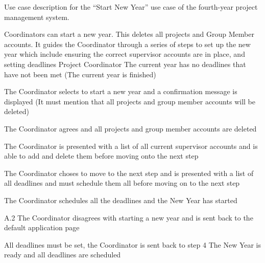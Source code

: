\documentclass[document.tex]{subfiles}
\begin{document}
\begin{table}
  \centering
  \caption{Use case description for the ``Start New Year'' use case of the fourth-year project management system.}
  \label{tbl:use-case-start-new-year}

  \begin{usecase}
    Coordinators can start a new year. This deletes all projects and Group Member accounts. It guides the Coordinator through a series of steps to set up the new year which include ensuring the correct supervisor accounts are in place, and setting deadlines
    Project Coordinator
    The current year has no deadlines that have not been met (The current year is finished)
    \ucnormal
    \begin{ucenum}
      \item The Coordinator selects to start a new year and a confirmation message is displayed (It must mention that all projects and group member accounts will be deleted)
      \item The Coordinator agrees and all projects and group member accounts are deleted
      \item The Coordinator is presented with a list of all current supervisor accounts and is able to add and delete them before moving onto the next step
      \item The Coordinator choses to move to the next step and is presented with a list of all deadlines and must schedule them all before moving on to the next step
      \item The Coordinator schedules all the deadlines and the New Year has started
    \end{ucenum}
    \begin{ucenum*}
      \item [A.2] The Coordinator disagrees with starting a new year and is sent back to the default application page
    \end{ucenum*}
    All deadlines must be set, the Coordinator is sent back to step 4
    The New Year is ready and all deadlines are scheduled
  \end{usecase}
\end{table}
\end{document}
